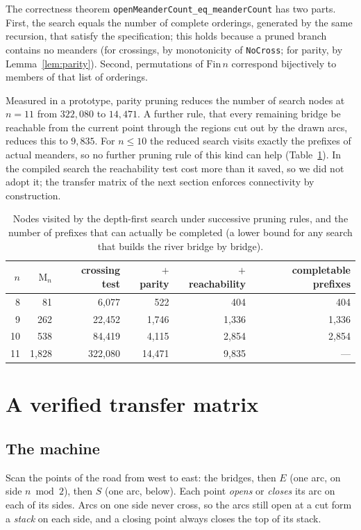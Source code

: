 \documentclass[11pt]{amsart}
\theoremstyle{definition}
\theoremstyle{remark}
\newcommand{\Open}{\mathrm{M}}
\newcommand{\code}[1]{\texttt{#1}}
\begin{document}
The correctness theorem \code{openMeanderCount\_eq\_meanderCount} has two parts. First, the
search equals the number of complete orderings, generated by the same recursion, that satisfy
the specification; this holds because a pruned branch contains no meanders (for crossings, by
monotonicity of \code{NoCross}; for parity, by Lemma~\ref{lem:parity}). Second, permutations of
$\mathrm{Fin}\,n$ correspond bijectively to members of that list of orderings.

Measured in a prototype, parity pruning reduces the number of search nodes at $n=11$ from
$322{,}080$ to $14{,}471$. A further rule, that every remaining bridge be reachable from the
current point through the regions cut out by the drawn arcs, reduces this to $9{,}835$. For
$n \le 10$ the reduced search visits exactly the prefixes of actual meanders, so no further
pruning rule of this kind can help (Table~\ref{tab:nodes}). In the compiled search the
reachability test cost more than it saved, so we did not adopt it; the transfer matrix of the
next section enforces connectivity by construction.

\begin{table}[t]
\centering
\begin{tabular}{rrrrrr}
\toprule
$n$ & $\Open_n$ & crossing test & $+$ parity & $+$ reachability & completable prefixes \\
\midrule
8  & 81    & 6{,}077   & 522     & 404    & 404 \\
9  & 262   & 22{,}452  & 1{,}746  & 1{,}336 & 1{,}336 \\
10 & 538   & 84{,}419  & 4{,}115  & 2{,}854 & 2{,}854 \\
11 & 1{,}828 & 322{,}080 & 14{,}471 & 9{,}835 & --- \\
\bottomrule
\end{tabular}
\caption{Nodes visited by the depth-first search under successive pruning rules, and the
number of prefixes that can actually be completed (a lower bound for any search that builds
the river bridge by bridge).}\label{tab:nodes}
\end{table}

\section{A verified transfer matrix}\label{sec:tm}

\subsection{The machine}
Scan the points of the road from west to east: the bridges, then $E$ (one arc, on side
$n \bmod 2$), then $S$ (one arc, below). Each point \emph{opens} or \emph{closes} its arc on
each of its sides. Arcs on one side never cross, so the arcs still open at a cut form a
\emph{stack} on each side, and a closing point always closes the top of its stack.
\end{document}
